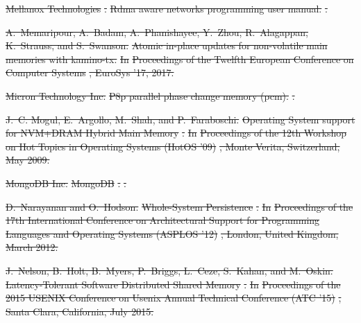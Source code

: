 \documentclass[sigconf]{acmart}
\renewcommand{\em}{\it}
\providecommand{\DIFdel}[1]{{\protect\color{red}\sout{#1}}}                      %
\begin{document}
{%
\DIFdel{Mellanox Technologies}%
\DIFdel{.
}%
\DIFdel{Rdma aware networks programming user manual.
}%
\DIFdel{.
}%

\DIFdel{A.~Memaripour, A.~Badam, A.~Phanishayee, Y.~Zhou, R.~Alagappan, K.~Strauss, and
  S.~Swanson.
}%
\DIFdel{Atomic in-place updates for non-volatile main memories with
  kamino-tx.
}%
\DIFdel{In }%
\DIFdel{Proceedings of the Twelfth European Conference on Computer
  Systems}%
\DIFdel{, EuroSys '17, 2017.
}%

\DIFdel{Micron Technology Inc.}%
\DIFdel{P8p parallel phase change memory (pcm).
}%
\DIFdel{.
}%

\DIFdel{J.~C. Mogul, E.~Argollo, M.~Shah, and P.~Faraboschi.
}%
\DIFdel{Operating System support for NVM+DRAM Hybrid Main Memory}%
\DIFdel{.
}%
\DIFdel{In }%
\DIFdel{Proceedings of the 12th Workshop on Hot Topics in Operating
  Systems (HotOS '09)}%
\DIFdel{, Monte Verita, Switzerland, May 2009.
}%

\DIFdel{MongoDB Inc.}%
\DIFdel{MongoDB}%
\DIFdel{.
}%
\DIFdel{.
}%

\DIFdel{D.~Narayanan and O.~Hodson.
}%
\DIFdel{Whole-System Persistence}%
\DIFdel{.
}%
\DIFdel{In }%
\DIFdel{Proceedings of the 17th International Conference on
  Architectural Support for Programming Languages and Operating Systems (ASPLOS
  ’12)}%
\DIFdel{, London, United Kingdom, March 2012.
}%

\DIFdel{J.~Nelson, B.~Holt, B.~Myers, P.~Briggs, L.~Ceze, S.~Kahan, and M.~Oskin.
}%
\DIFdel{Latency-Tolerant Software Distributed Shared Memory}%
\DIFdel{.
}%
\DIFdel{In }%
\DIFdel{Proceedings of the 2015 USENIX Conference on Usenix Annual
  Technical Conference (ATC ’15)}%
\DIFdel{, Santa Clara, California, July 2015.
}%

}
\end{document}
